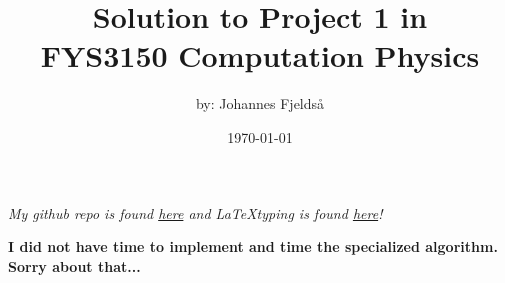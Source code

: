 \documentclass[english,notitlepage]{article}  %
\begin{document}
\title{Solution to Project 1 in \\
\huge FYS3150 Computation Physics \\}      %
\author{by: Johannes Fjeldså}
\date{\today}                      %
\noaffiliation                            %


\maketitle 
    
\textit{My github repo is found \href{https://github.com/Johannesfjeldsaa/FYS3150/tree/Project1}{here} and \LaTeX typing is found \href{https://github.com/Johannesfjeldsaa/FYS3150_Latex}{here}!}
    
\newpage


\newpage


\newpage


\newpage


\newpage


\newpage



\newpage


\newpage


\newpage


\textbf{I did not have time to implement and time the specialized algorithm. Sorry about that...
}
\printbibliography
\end{document}
